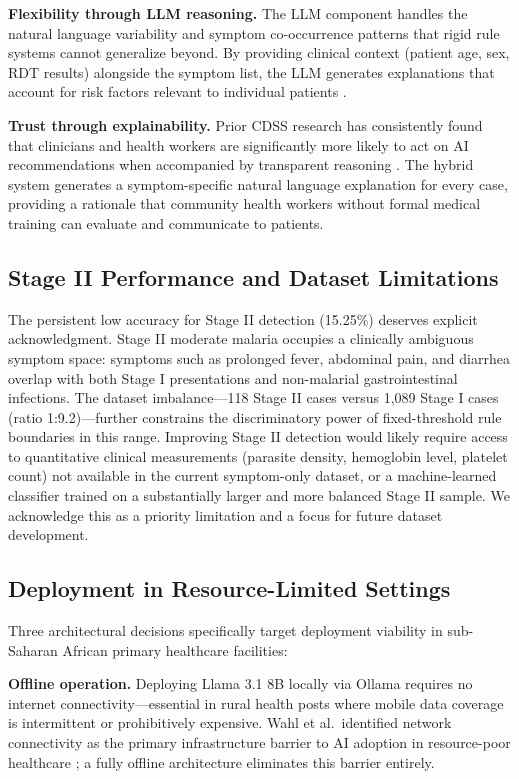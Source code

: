 \documentclass[12pt,a4paper]{article}
\begin{document}
\textbf{Flexibility through LLM reasoning.} The LLM component handles the natural language variability and symptom co-occurrence patterns that rigid rule systems cannot generalize beyond. By providing clinical context (patient age, sex, RDT results) alongside the symptom list, the LLM generates explanations that account for risk factors relevant to individual patients \cite{ref17}.

\textbf{Trust through explainability.} Prior CDSS research has consistently found that clinicians and health workers are significantly more likely to act on AI recommendations when accompanied by transparent reasoning \cite{ref8}. The hybrid system generates a symptom-specific natural language explanation for every case, providing a rationale that community health workers without formal medical training can evaluate and communicate to patients.

\subsection{Stage II Performance and Dataset Limitations}

The persistent low accuracy for Stage II detection (15.25\%) deserves explicit acknowledgment. Stage II moderate malaria occupies a clinically ambiguous symptom space: symptoms such as prolonged fever, abdominal pain, and diarrhea overlap with both Stage I presentations and non-malarial gastrointestinal infections. The dataset imbalance---118 Stage II cases versus 1,089 Stage I cases (ratio 1:9.2)---further constrains the discriminatory power of fixed-threshold rule boundaries in this range. Improving Stage II detection would likely require access to quantitative clinical measurements (parasite density, hemoglobin level, platelet count) not available in the current symptom-only dataset, or a machine-learned classifier trained on a substantially larger and more balanced Stage II sample. We acknowledge this as a priority limitation and a focus for future dataset development.

\subsection{Deployment in Resource-Limited Settings}

Three architectural decisions specifically target deployment viability in sub-Saharan African primary healthcare facilities:

\textbf{Offline operation.} Deploying Llama 3.1 8B locally via Ollama \cite{ref9,ref13} requires no internet connectivity---essential in rural health posts where mobile data coverage is intermittent or prohibitively expensive. Wahl et al.\ identified network connectivity as the primary infrastructure barrier to AI adoption in resource-poor healthcare \cite{ref20}; a fully offline architecture eliminates this barrier entirely.
\end{document}
